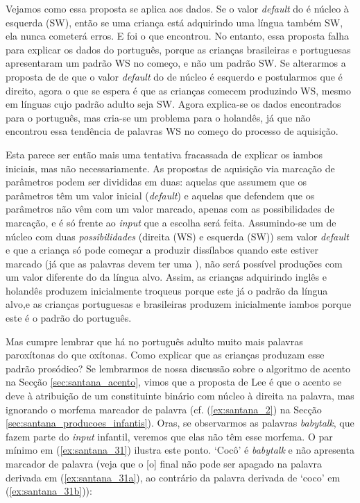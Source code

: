 \documentclass[output=paper]{LSP/langsci}
\begin{document}
Vejamos como essa proposta se aplica aos dados. Se o valor \textit{default} do  é núcleo à esquerda (SW), então se uma criança está adquirindo uma língua também SW, ela nunca cometerá erros. E foi o que \citeauthor{fikkert1994} encontrou. No entanto, essa proposta falha para explicar os dados do português, porque as crianças brasileiras e portuguesas apresentaram um padrão WS no começo, e não um padrão SW. Se alterarmos a proposta de \citeauthor{fikkert1994} de que o valor \textit{default} do  de núcleo é esquerdo e postularmos que é direito, agora o que se espera é que as crianças comecem produzindo WS, mesmo em línguas cujo padrão adulto seja SW. Agora explica-se os dados encontrados para o português, mas cria-se um problema para o holandês, já que \citeauthor{fikkert1994} não encontrou essa tendência de palavras WS no começo do processo de aquisição.

Esta parece ser então mais uma tentativa fracassada de explicar os iambos iniciais, mas não necessariamente. As propostas de aquisição via marcação de parâmetros podem ser divididas em duas: aquelas que assumem que os parâmetros têm um valor inicial (\textit{default}) e aquelas que defendem que os parâmetros não vêm com um valor marcado, apenas com as possibilidades de marcação, e é só frente ao \textit{input} que a escolha será feita. Assumindo-se um  de núcleo com duas \textit{possibilidades} (direita (WS) e esquerda (SW)) sem valor \textit{default} e que a criança só pode começar a produzir dissílabos quando este  estiver marcado (já que as palavras devem ter uma ), não será possível produções com um valor diferente do da língua alvo. Assim, as crianças adquirindo inglês e holandês produzem inicialmente troqueus porque este já o padrão da língua alvo,\largerpage e as crianças portuguesas e brasileiras produzem inicialmente iambos porque este é o padrão do português. 

Mas cumpre lembrar que há no português adulto muito mais palavras paroxítonas do que oxítonas. Como explicar que as crianças produzam esse padrão prosódico? Se lembrarmos de nossa discussão sobre o algoritmo de acento na Secção \ref{sec:santana_acento}, vimos que a proposta de Lee é que o acento se deve à atribuição de um constituinte binário com núcleo à direita na palavra, mas ignorando o morfema marcador de palavra (cf. (\ref{ex:santana_2}) na Secção \ref{sec:santana_producoes_infantis}). Oras, se observarmos as palavras \textit{babytalk}, que fazem parte do \textit{input} infantil, veremos que elas não têm esse morfema. O par mínimo em (\ref{ex:santana_31}) ilustra este ponto. `Cocô' é \textit{babytalk} e não apresenta marcador de palavra (veja que o [o] final não pode ser apagado na palavra derivada em (\ref{ex:santana_31a}), ao contrário da palavra derivada de `coco' em (\ref{ex:santana_31b})):
\end{document}
